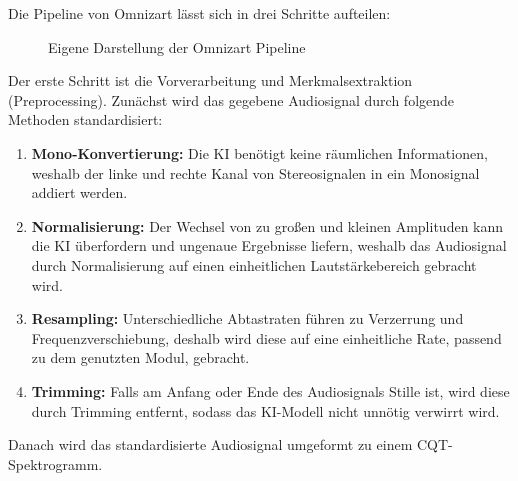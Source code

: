 Die Pipeline von Omnizart lässt sich in drei Schritte aufteilen:
\begin{figure}[H]
    \vspace{1em}
    \vspace{1em}
    \label{fig:omnizart}
    \caption[Omnizart Pipeline]{Eigene Darstellung der Omnizart Pipeline}
\end{figure}

Der erste Schritt ist die Vorverarbeitung und Merkmalsextraktion (Preprocessing).
Zunächst wird das gegebene Audiosignal durch folgende Methoden standardisiert:
\begin{enumerate}
    \item \textbf{Mono-Konvertierung:} Die KI benötigt keine räumlichen Informationen, weshalb der linke und rechte Kanal von Stereosignalen in ein Monosignal addiert werden.
    \item \textbf{Normalisierung:} Der Wechsel von zu großen und kleinen Amplituden kann die KI überfordern und ungenaue Ergebnisse liefern, weshalb das Audiosignal durch Normalisierung auf einen einheitlichen Lautstärkebereich gebracht wird.
    \item \textbf{Resampling:} Unterschiedliche Abtastraten führen zu Verzerrung und Frequenzverschiebung, deshalb wird diese auf eine einheitliche Rate, passend zu dem genutzten Modul, gebracht.
    \item \textbf{Trimming:} Falls am Anfang oder Ende des Audiosignals Stille ist, wird diese durch Trimming entfernt, sodass das KI-Modell nicht unnötig verwirrt wird.
\end{enumerate}
Danach wird das standardisierte Audiosignal umgeformt zu einem CQT-Spektrogramm.

